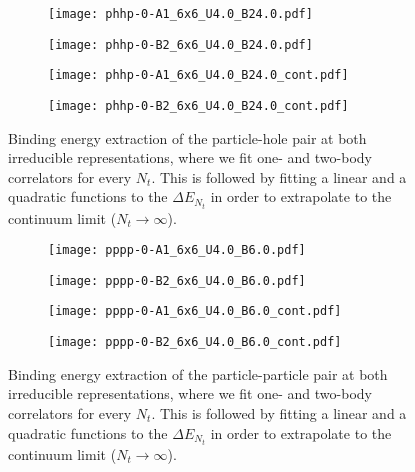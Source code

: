 \begin{figure}
  \begin{subfigure}{.5\textwidth}
    \centering
    \texttt{[image: phhp-0-A1\_6x6\_U4.0\_B24.0.pdf]}
  \end{subfigure}%
  \begin{subfigure}{.5\textwidth}
    \centering
    \texttt{[image: phhp-0-B2\_6x6\_U4.0\_B24.0.pdf]}
  \end{subfigure}
  \begin{subfigure}{.5\textwidth}
      \centering
      \texttt{[image: phhp-0-A1\_6x6\_U4.0\_B24.0\_cont.pdf]}
  \end{subfigure}
  \begin{subfigure}{.5\textwidth}
      \centering
      \texttt{[image: phhp-0-B2\_6x6\_U4.0\_B24.0\_cont.pdf]}
  \end{subfigure}
  \caption{Binding energy extraction of the particle-hole pair at both irreducible representations, where we fit one- and two-body correlators for every $N_t$. This is followed by fitting a linear and a quadratic functions to the $\Delta E_{N_t}$ in order to extrapolate to the continuum limit ($N_t\to\infty$).}
  \label{fig:fig17}
\end{figure}

\begin{figure}
  \begin{subfigure}{.5\textwidth}
    \centering
    \texttt{[image: pppp-0-A1\_6x6\_U4.0\_B6.0.pdf]}
  \end{subfigure}%
  \begin{subfigure}{.5\textwidth}
    \centering
    \texttt{[image: pppp-0-B2\_6x6\_U4.0\_B6.0.pdf]}
  \end{subfigure}
  \begin{subfigure}{.5\textwidth}
      \centering
      \texttt{[image: pppp-0-A1\_6x6\_U4.0\_B6.0\_cont.pdf]}
  \end{subfigure}
  \begin{subfigure}{.5\textwidth}
      \centering
      \texttt{[image: pppp-0-B2\_6x6\_U4.0\_B6.0\_cont.pdf]}
  \end{subfigure}
  \caption{Binding energy extraction of the particle-particle pair at both irreducible representations, where we fit one- and two-body correlators for every $N_t$. This is followed by fitting a linear and a quadratic functions to the $\Delta E_{N_t}$ in order to extrapolate to the continuum limit ($N_t\to\infty$).}
  \label{fig:fig18}
\end{figure}

